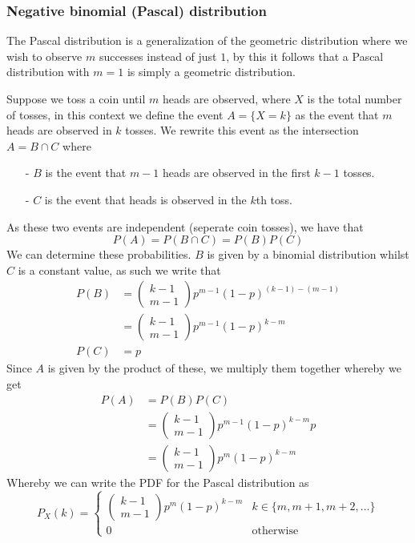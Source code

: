 \subsubsection{Negative binomial (Pascal) distribution}
The Pascal distribution is a generalization of the geometric distribution where we wish to observe $m$ successes instead of just $1$, by this it follows that a Pascal distribution with $m=1$ is simply a geometric distribution.

Suppose we toss a coin until $m$ heads are observed, where $X$ is the total number of tosses, in this context we define the event $A=\{X=k\}$ as the event that $m$ heads are observed in $k$ tosses. We rewrite this event as the intersection $A=B\cap C$ where
\begin{itemize}
    \item[-] $B$ is the event that $m-1$ heads are observed in the first $k-1$ tosses.
    \item[-] $C$ is the event that heads is observed in the $k$th toss.
\end{itemize}
As these two events are independent (seperate coin tosses), we have that
\[
    P(A)=P(B\cap C)=P(B)P(C)
\]
We can determine these probabilities. $B$ is given by a binomial distribution whilst $C$ is a constant value, as such we write that
\begin{align*}
    P(B)&=\begin{pmatrix}k-1\\m-1\end{pmatrix}p^{m-1}(1-p)^{(k-1)-(m-1)} \\
        &=\begin{pmatrix}k-1\\m-1\end{pmatrix}p^{m-1}(1-p)^{k-m} \\
    P(C)&=p
\end{align*}
Since $A$ is given by the product of these, we multiply them together whereby we get
\begin{align*}
    P(A)&=P(B)P(C) \\
        &=\begin{pmatrix}k-1\\m-1\end{pmatrix}p^{m-1}(1-p)^{k-m}p \\
        &=\begin{pmatrix}k-1\\m-1\end{pmatrix}p^{m}(1-p)^{k-m}
\end{align*}
Whereby we can write the PDF for the Pascal distribution as
\[
    P_{X}(k)=\begin{cases}\begin{pmatrix}k-1\\m-1\end{pmatrix}p^{m}(1-p)^{k-m} & k\in\{m,m+1,m+2,\ldots\} \\ 0 & \text{otherwise}\end{cases}
\]
